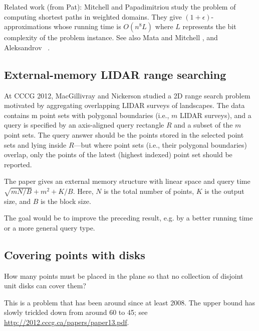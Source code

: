 \documentclass{patmorin}
\newcommand{\poser}[1]{\noindent{\textit{#1}}}
\begin{document}
Related work (from Pat):  Mitchell and Papadimitriou \cite{mp91} study the
problem of computing shortest paths in weighted domains.  They give
$(1+\epsilon)$-approximations whose running time is $O(n^8L)$ where $L$
represents the bit complexity of the problem instance.  See also Mata
and Mitchell \cite{mm97}, and Aleksandrov \etal\ \cite{ams05}.

\subsection{External-memory LIDAR range searching}

\poser{Rolf Fagerberg}

At CCCG 2012, MacGillivray and Nickerson studied a 2D range search
problem motivated by aggregating overlapping LIDAR surveys of
landscapes. The data contains m point sets with polygonal boundaries
(i.e., $m$ LIDAR surveys), and a query is specified by an axis-aligned
query rectangle $R$ and a subset of the $m$ point sets. The query answer
should be the points stored in the selected point sets and lying inside
$R$---but where point sets (i.e., their polygonal boundaries) overlap,
only the points of the latest (highest indexed) point set should be
reported.

The paper gives an external memory structure with linear space and query
time $\sqrt{mN/B} + m^2 + K/B$. Here, $N$ is the total number of points, $K$ is
the output size, and $B$ is the block size.

\begin{op}
  The goal would be to improve the preceding result, e.g. by a better
  running time or a more general query type.
\end{op}


\subsection{Covering points with  disks}  

\poser{Greg Aloupis}


\begin{op}
  How many points must be placed in the plane so that no collection of
  disjoint unit disks can cover them?
\end{op}


This is a problem that has been around since at least 2008.
The upper bound has slowly trickled down from around 60 to 45; see
\url{http://2012.cccg.ca/papers/paper13.pdf}.
\end{document}
